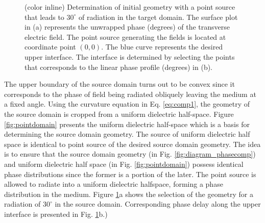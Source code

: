 %
\begin{figure}[t!]
\centering
\noindent
\hspace*{\fill}%
  \mbox{}
\hspace*{\fill}%
	\mbox{\subfloat[]
        {
        }}
 \hspace*{\fill}%
\caption[Selection of a source domain geometry using a target linear phase profile.]{(color inline) Determination of initial geometry with a point source that leads to $30^\circ$ of radiation in the target domain. The surface plot in (a) represents the unwrapped phase (degrees) of the transverse electric field. The point source generating the fields is located at coordinate point $(0,0)$. The blue curve represents the desired upper interface. The interface is determined by selecting the points that corresponds to the linear phase profile (degrees) in (b).}
\label{fig:inidet}
\end{figure}
%

The upper boundary of the source domain turns out to be convex since it corresponds to the phase of field being radiated obliquely leaving the medium at a fixed angle. Using the curvature equation in Eq. \ref{eq:comp1}, the geometry of the source domain is cropped from a uniform dielectric half-space. Figure \ref{fig:pointdomain} presents the uniform dielectric half-space which is a basis for determining the source domain geometry. The source of uniform dielectric half space is identical to point source of the desired source domain geometry. The idea is to ensure that the source domain geometry (in Fig. \ref{fig:diagram_phasecomp}) and uniform dielectric half space (in Fig. \ref{fig:pointdomain}) possess identical phase distributions since the former is a portion of the later. 
The point source is allowed to radiate into a uniform dielectric halfspace, forming a phase distribution in the medium. Figure \ref{fig:inidet}a shows the selection of the geometry for a radiation of $30^\circ$ in the source domain. Corresponding phase delay along the upper interface is presented in Fig. \ref{fig:inidet}b.) 



